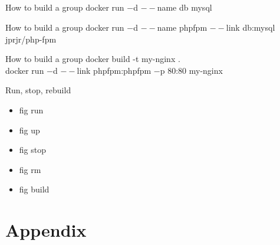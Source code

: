 \documentclass{beamer}
\begin{document}
    \subsection{}
    \begin{frame}{How to build a group}
        docker run $-$d $--$name db mysql\\
        \lstFigYmlMysql
    \end{frame}
    \begin{frame}{How to build a group}
        docker run $-$d $--$name phpfpm $--$link db:mysql jprjr/php-fpm\\
        \lstFigYmlPhpFpm
    \end{frame}
    \begin{frame}{How to build a group}
        docker build -t my-nginx .\\
        docker run $-$d $--$link phpfpm:phpfpm $-$p 80:80 my-nginx\\
        \lstFigYmlNginx
    \end{frame}
    \begin{frame}{Run, stop, rebuild}
        \begin{itemize}
            \item fig run
            \item fig up
            \item fig stop
            \item fig rm
            \item fig build
        \end{itemize}
    \end{frame}
    \section{Appendix}
\end{document}
